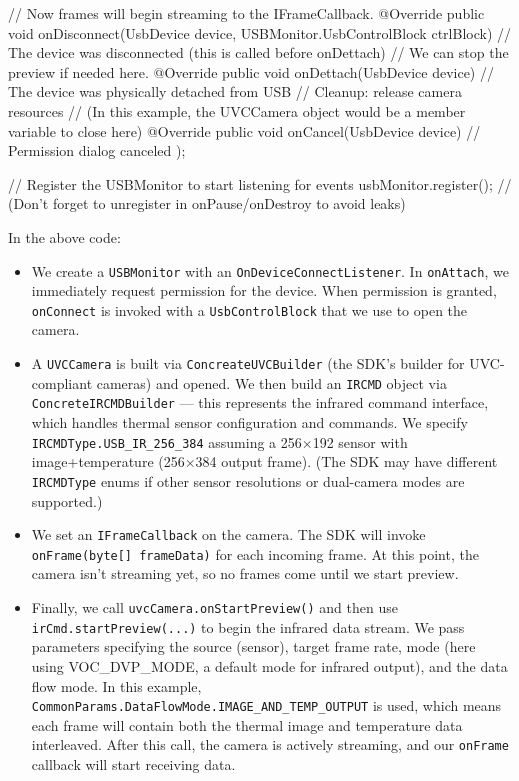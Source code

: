 {{{            // Now frames will begin streaming to the IFrameCallback.
        }
        @Override 
        public void onDisconnect(UsbDevice device, USBMonitor.UsbControlBlock ctrlBlock) {
            // The device was disconnected (this is called before onDettach)
            // We can stop the preview if needed here.
        }
        @Override 
        public void onDettach(UsbDevice device) {
            // The device was physically detached from USB
            // Cleanup: release camera resources
            // (In this example, the UVCCamera object would be a member variable to close here)
        }
        @Override 
        public void onCancel(UsbDevice device) {
            // Permission dialog canceled
        }
    });

    // Register the USBMonitor to start listening for events
    usbMonitor.register();
    // (Don’t forget to unregister in onPause/onDestroy to avoid leaks)

In the above code:

\begin{itemize}
\item We create a \texttt{USBMonitor} with an \texttt{OnDeviceConnectListener}. In
  \texttt{onAttach}, we immediately request permission for the device. When
  permission is granted, \texttt{onConnect} is invoked with a \texttt{UsbControlBlock}
  that we use to open the camera.
\item A \texttt{UVCCamera} is built via \texttt{ConcreateUVCBuilder} (the SDK's builder
  for UVC-compliant cameras) and opened. We then build an \texttt{IRCMD} object
  via \texttt{ConcreteIRCMDBuilder} --- this represents the infrared command
  interface, which handles thermal sensor configuration and commands. We
  specify \texttt{IRCMDType.USB_IR_256_384} assuming a 256×192 sensor with
  image+temperature (256×384 output
  frame)\cite{GSRGuideIMotions}\cite{ElectrodermalActivityWiki}.
  (The SDK may have different \texttt{IRCMDType} enums if other sensor
  resolutions or dual-camera modes are supported.)
\item We set an \texttt{IFrameCallback} on the camera. The SDK will invoke
  \texttt{onFrame(byte[] frameData)} for each incoming frame. At this point,
  the camera isn't streaming yet, so no frames come until we start
  preview.
\item Finally, we call \texttt{uvcCamera.onStartPreview()} and then use
  \texttt{irCmd.startPreview(...)} to begin the infrared data
  stream\cite{ElectrodermalActivityWiki}\cite{ElectrodermalActivityWiki}.
  We pass parameters specifying the source (sensor), target frame rate,
  mode (here using VOC_DVP_MODE, a default mode for infrared output),
  and the data flow mode. In this example,
  \texttt{CommonParams.DataFlowMode.IMAGE_AND_TEMP_OUTPUT} is used, which means
  each frame will contain both the thermal image and temperature data
  interleaved\cite{ElectrodermalActivityWiki}.
  After this call, the camera is actively streaming, and our \texttt{onFrame}
  callback will start receiving data.


\end{itemize}}
